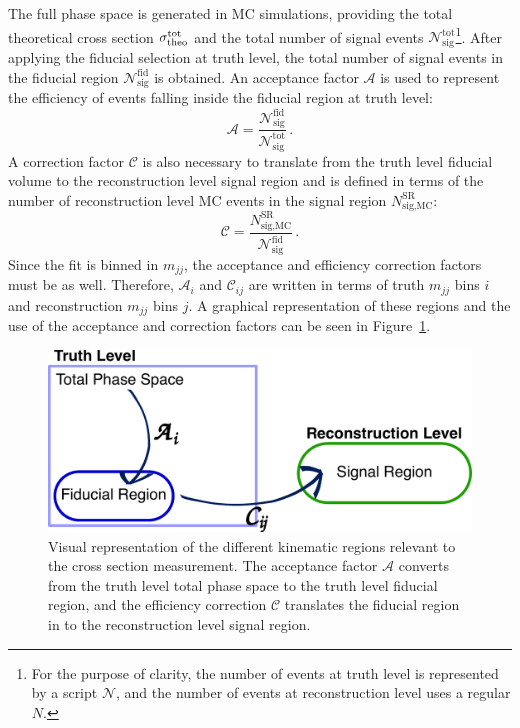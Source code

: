 The full phase space is generated in MC simulations, providing the total theoretical cross section $\sigma_{\textrm{theo}}^{\textrm{tot}}$
and the total number of signal events $\mathcal{N}_{\textrm{sig}}^{\textrm{tot}}$\footnote{For the purpose of clarity, the number of events at truth level is represented by a script $\mathcal{N}$, and the number of events at reconstruction level uses a regular $N$.}.
After applying the fiducial selection at truth level, the total number of signal events in the fiducial region $\mathcal{N}_{\textrm{sig}}^{\textrm{fid}}$ is obtained.
An acceptance factor $\mathcal{A}$ is used to represent the efficiency of events falling inside the fiducial region at truth level:
\begin{equation}
  \mathcal{A} = \frac{\mathcal{N}_{\textrm{sig}}^{\textrm{fid}}}{\mathcal{N}_{\textrm{sig}}^{\textrm{tot}}}\,.
  \label{eq:ssww13tev_xsec_acceptance}
\end{equation}
A correction factor $\mathcal{C}$ is also necessary to translate from the truth level fiducial volume to the reconstruction level signal region and is defined in terms of the number of reconstruction level MC events in the signal region $N_{\textrm{sig,MC}}^{\textrm{SR}}$:
\begin{equation}
  \mathcal{C} = \frac{N_{\textrm{sig,MC}}^{\textrm{SR}}}{\mathcal{N}_{\textrm{sig}}^{\textrm{fid}}}\,.
  \label{eq:ssww13tev_xsec_efficiency}
\end{equation}
Since the fit is binned in $m_{jj}$, the acceptance and efficiency correction factors must be as well.
Therefore, $\mathcal{A}_i$ and $\mathcal{C}_{ij}$ are written in terms of truth $m_{jj}$ bins $i$ and reconstruction $m_{jj}$ bins $j$.
A graphical representation of these regions and the use of the acceptance and correction factors can be seen in Figure~\ref{fig:ssww13tev_xsec_fiducial_graphic}.

\begin{figure}[htbp]
  \centering
  \includegraphics[width=.8\textwidth]{figs/ssww_13tev/xsec/fiducial}
  \caption{Visual representation of the different kinematic regions relevant to the cross section measurement.  The acceptance factor $\mathcal{A}$ converts from the truth level total phase space to the truth level fiducial region, and the efficiency correction $\mathcal{C}$ translates the fiducial region in to the reconstruction level signal region.}
  \label{fig:ssww13tev_xsec_fiducial_graphic}
\end{figure}

